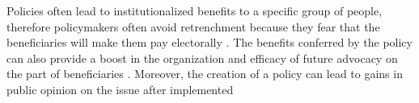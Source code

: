 Policies often lead to institutionalized benefits to a specific group of people, therefore policymakers often avoid retrenchment because they fear that the beneficiaries will make them pay electorally \citep{pierson_1996}. The benefits conferred by the policy can also provide a boost in the organization \citep{campbell_2003} and efficacy of future advocacy on the part of beneficiaries \citep{amenta_and_caren_2004}. Moreover, the creation of a policy can lead to gains in public opinion on the issue after implemented \citep{amenta_and_elliott_2019}









